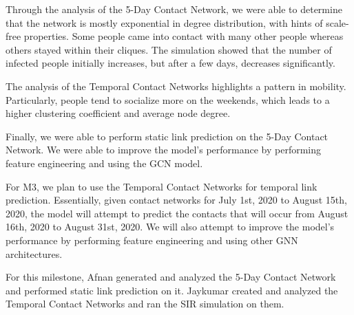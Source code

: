 \documentclass[times, 10pt,twocolumn]{article}
\begin{document}


Through the analysis of the 5-Day Contact Network, we were able to determine that the network is mostly exponential in degree distribution, with hints of scale-free properties. Some people came into contact with many other people whereas others stayed within their cliques. The simulation showed that the number of infected people initially increases, but after a few days, decreases significantly.

The analysis of the Temporal Contact Networks highlights a pattern in mobility. Particularly, people tend to socialize more on the weekends, which leads to a higher clustering coefficient and average node degree.

Finally, we were able to perform static link prediction on the 5-Day Contact Network. We were able to improve the model's performance by performing feature engineering and using the GCN model. 

For M3, we plan to use the Temporal Contact Networks for temporal link prediction. Essentially, given contact networks for July 1st, 2020 to August 15th, 2020, the model will attempt to predict the contacts that will occur from August 16th, 2020 to August 31st, 2020. We will also attempt to improve the model's performance by performing feature engineering and using other GNN architectures.

For this milestone, Afnan generated and analyzed the 5-Day Contact Network and performed static link prediction on it. Jaykumar created and analyzed the Temporal Contact Networks and ran the SIR simulation on them.


\end{document}

